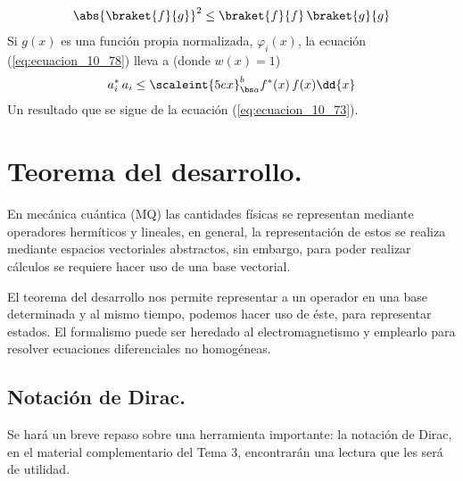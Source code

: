 \begin{align}
\abs{\braket{f}{g}}^{2} \leq \braket{f}{f} \, \braket{g}{g}
\label{eq:ecuacion_10_78a}
\end{align}
Si $g(x)$ es una función propia normalizada, $\varphi_{i}(x)$, la ecuación (\ref{eq:ecuacion_10_78}) lleva a (donde $w(x)=1$)
\begin{align}
a_{i}^{*} \, a_{i} \leq \scaleint{5ex}_{\bs a}^{b} f^{*}(x) \, f(x) \dd{x} 
\label{eq:ecuacion_10_81}
\end{align}
Un resultado que se sigue de la ecuación (\ref{eq:ecuacion_10_73}).

\section{Teorema del desarrollo.}

En mecánica cuántica (MQ) las cantidades físicas se representan mediante operadores hermíticos y lineales, en general, la representación de estos se realiza mediante espacios vectoriales abstractos, sin embargo, para poder realizar cálculos se requiere hacer uso de una base vectorial.
\par
El teorema del desarrollo nos permite representar a un operador en una base determinada y al mismo tiempo, podemos hacer uso de éste, para representar estados. El formalismo puede ser heredado al electromagnetismo y emplearlo para resolver ecuaciones diferenciales no homogéneas.

\subsection{Notación de Dirac.}

Se hará un breve repaso sobre una herramienta importante: la notación de Dirac, en el material complementario del Tema 3, encontrarán una lectura que les será de utilidad.

